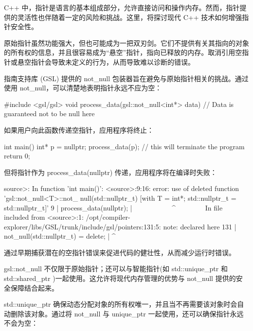 
C++ 中，指针是语言的基本组成部分，允许直接访问和操作内存。然而，指针提供的灵活性也伴随着一定的风险和挑战。这里，将探讨现代 C++ 技术如何增强指针安全性。


原始指针虽然功能强大，但也可能成为一把双刃剑。它们不提供有关其指向的对象的所有权的信息，并且很容易成为“悬空”指针，指向已释放的内存。取消引用空指针或悬空指针会导致未定义的行为，从而导致难以诊断的错误。


指南支持库 (GSL) 提供的 not\_null 包装器旨在避免与原始指针相关的挑战。通过使用 not\_null，可以清楚地表明指针永远不应为空：

\begin{cpp}
#include <gsl/gsl>
void process_data(gsl::not_null<int*> data) {
    // Data is guaranteed not to be null here
}
\end{cpp}

如果用户向此函数传递空指针，应用程序将终止：

\begin{cpp}
int main() {
    int* p = nullptr;
    process_data(p); // this will terminate the program
    return 0;
}
\end{cpp}

但将指针作为 process\_data(nullptr) 传递，应用程序将在编译时失败：

\begin{shell}
source>: In function 'int main()':
<source>:9:16: error: use of deleted function 'gsl::not_null<T>::not_
null(std::nullptr_t) [with T = int*; std::nullptr_t = std::nullptr_t]'
    9 | process_data(nullptr);
      | ~~~~~~~~~~~^~~~~~~~~
In file included from <source>:1:
/opt/compiler-explorer/libs/GSL/trunk/include/gsl/pointers:131:5:
note: declared here
  131 | not_null(std::nullptr_t) = delete;
      | ^~~~~~~~
\end{shell}

通过早期捕获潜在的空指针错误来促进代码的健壮性，从而减少运行时错误。


gsl::not\_null 不仅限于原始指针；还可以与智能指针(如 std::unique\_ptr 和 std::shared\_ptr )一起使用。这允许将现代内存管理的优势与 not\_null 提供的安全保障结合起来。


std::unique\_ptr 确保动态分配对象的所有权唯一，并且当不再需要该对象时会自动删除该对象。通过将 not\_null 与 unique\_ptr 一起使用，还可以确保指针永远不会为空：

